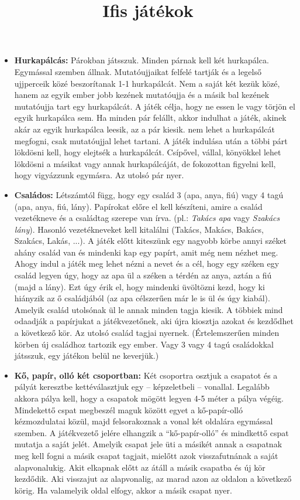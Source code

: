 \documentclass[a4paper, 12pt, twoside, openright]{article}
\begin{document}
\title{Ifis játékok}
\maketitle

\begin{itemize}
\item \textbf{Hurkapálcás:} Párokban játsszuk. Minden párnak kell két hurkapálca. Egymással szemben állnak. Mutatóujjaikat felfelé tartják és a legelső ujjperceik közé beszorítanak 1-1 hurkapálcát. Nem a saját két kezük közé, hanem az egyik ember jobb kezének mutatóujja és a másik bal kezének mutatóujja tart egy hurkapálcát. A játék célja, hogy ne essen le vagy törjön el egyik hurkapálca sem. Ha minden pár felállt, akkor indulhat a játék, akinek akár az egyik hurkapálca leesik, az a pár kiesik. nem lehet a hurkapálcát megfogni, csak mutatóujjal lehet tartani. A játék indulása után a többi párt lökdösni kell, hogy elejtsék a hurkapálcát. Csípővel, vállal, könyökkel lehet lökdösni a másikat vagy annak hurkapálcáját, de fokozottan figyelni kell, hogy vigyázzunk egymásra. Az utolsó pár nyer.

\item \textbf{Családos:} Létszámtól függ, hogy egy család 3 (apa, anya, fiú) vagy 4 tagú (apa, anya, fiú, lány). Papírokat előre el kell készíteni, amire a család vezetékneve és a családtag szerepe van írva. (pl.: \emph{Takács apa} vagy \emph{Szakács lány}). Hasonló vezetékneveket kell kitalálni (Takács, Makács, Bakács, Szakács, Lakás, ...). A játék előtt kiteszünk egy nagyobb körbe annyi széket ahány család van és mindenki kap egy papírt, amit még nem nézhet meg. Ahogy indul a játék meg lehet nézni a nevet és a cél, hogy egy széken egy család legyen úgy, hogy az apa ül a széken a térdén az anya, aztán a fiú (majd a lány). Ezt úgy érik el, hogy mindenki üvöltözni kezd, hogy ki hiányzik az ő családjából (az apa célszerűen már le is ül és úgy kiabál). Amelyik család utolsónak ül le annak minden tagja kiesik. A többiek mind odaadják a papírjukat a játékvezetőnek, aki újra kiosztja azokat és kezdődhet a következő kör. Az utolsó család tagjai nyernek.
(Értelemszerűen minden körben új családhoz tartozik egy ember. Vagy 3 vagy 4 tagú családokkal játsszuk, egy játékon belül ne keverjük.)

\item \textbf{Kő, papír, olló két csoportban:} Két csoportra osztjuk a csapatot és a pályát keresztbe kettéválasztjuk egy -- képzeletbeli -- vonallal. Legalább akkora pálya kell, hogy a csapatok mögött legyen 4-5 méter a pálya végéig. Mindekettő cspat megbeszél maguk között egyet a kő-papír-olló kézmozdulatai közül, majd felsorakoznak a vonal két oldalára egymással szemben. A játékvezető jelére elhangzik a ``kő-papír-olló'' és mindkettő cspat mutatja a saját jelét. Amelyik csapat jele üti a másikét annak a csapatnak meg kell fogni a másik csapat tagjait, mielőtt azok visszafutnának a saját alapvonalukig. Akit elkapnak előtt az átáll a másik csapatba és új kör kezdődik. Aki visszajut az alapvonalig, az marad azon az oldalon a következő körig. Ha valamelyik oldal elfogy, akkor a másik csapat nyer.


\end{itemize}
\end{document}
